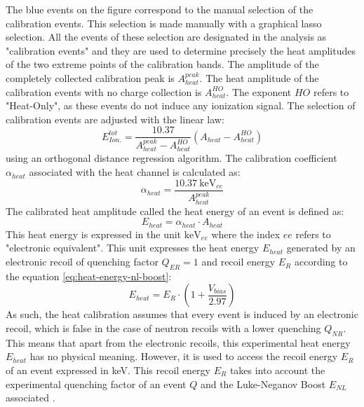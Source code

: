 The blue events on the figure correspond to the manual selection of the calibration events. This selection is made manually with a graphical lasso selection. All the events of these selection are designated in the analysis as "calibration events" and they are used to determine precisely the heat amplitudes of the two extreme points of the calibration bands. The  amplitude of the completely collected calibration peak is $A_{heat}^{peak}$. The heat amplitude of the calibration events with no charge collection is  $A_{heat}^{HO}$. The exponent $HO$ refers to "Heat-Only", as these events do not induce any ionization signal. The selection of calibration events are adjusted with the linear law:
\begin{equation}
E_{Ion.}^{tot} = \frac{10.37}{A_{heat}^{peak} - A_{heat}^{HO}} (A_{heat} - A_{heat}^{HO})
\end{equation}
using an orthogonal distance regression algorithm. The calibration coefficient $\alpha_{heat}$ associated with the heat channel is calculated as:
\begin{equation}
\alpha_{heat} = \frac{\SI{10.37}{\kilo\eV_{ee}}}{A_{heat}^{peak}}
\end{equation}
The calibrated heat amplitude called the heat energy of an event is defined as:
\begin{equation}
E_{heat} = \alpha_{heat} \cdot A_{heat}
\end{equation}
This heat energy is expressed in the unit $\si{\kilo\eV_{ee}}$ where the index $ee$ refers to "electronic equivalent". This unit expresses the heat energy $E_{heat}$ generated by an electronic recoil of quenching factor $Q_{ER}=1$ and recoil energy $E_R$ according to the equation \ref{eq:heat-energy-nl-boost}:
\begin{equation}
E_{heat} = E_R \cdot \left( 1 + \frac{V_{bias}}{2.97} \right)
\end{equation}
As such, the heat calibration assumes that every event is induced by an electronic recoil, which is false in the case of neutron recoils with a lower quenching $Q_{NR}$. This means that apart from the electronic recoils, this experimental heat energy $E_{heat}$ has no physical meaning. However, it is used to access the recoil energy $E_R$ of an event expressed in \si{\kilo\eV}. This recoil energy $E_R$ takes into account the experimental quenching factor of an event $Q$ and the Luke-Neganov Boost $E_{NL}$ associated . 

